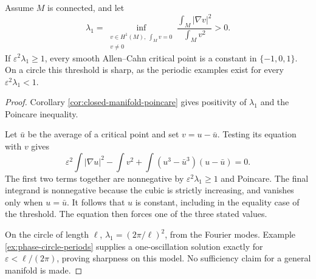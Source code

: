 \begin{proposition}\label{prop:phase-poincare-threshold}
Assume $M$ is connected, and let
\[
 \lambda_1=\inf_{\substack{v\in H^1(M),\ \int_Mv=0\\v\ne0}}
          \frac{\int_M|\nabla v|^2}{\int_Mv^2}>0.
\]
If $\varepsilon^2\lambda_1\geq1$, every smooth Allen--Cahn critical point is a constant in $\{-1,0,1\}$. On a circle this threshold is sharp, as the periodic examples exist for every $\varepsilon^2\lambda_1<1$.
\end{proposition}
\begin{proof}
Corollary \ref{cor:closed-manifold-poincare} gives positivity of $\lambda_1$ and the Poincare inequality.

Let $\bar u$ be the average of a critical point and set $v=u-\bar u$. Testing its equation with $v$ gives
\[
 \varepsilon^2\int|\nabla u|^2-\int v^2
    +\int(u^3-\bar u^3)(u-\bar u)=0.
\]
The first two terms together are nonnegative by $\varepsilon^2\lambda_1\geq1$ and Poincare. The final integrand is nonnegative because the cubic is strictly increasing, and vanishes only when $u=\bar u$. It follows that $u$ is constant, including in the equality case of the threshold. The equation then forces one of the three stated values.

On the circle of length $\ell$, $\lambda_1=(2\pi/\ell)^2$, from the Fourier modes. Example \ref{ex:phase-circle-periods} supplies a one-oscillation solution exactly for $\varepsilon<\ell/(2\pi)$, proving sharpness on this model. No sufficiency claim for a general manifold is made.
\end{proof}
